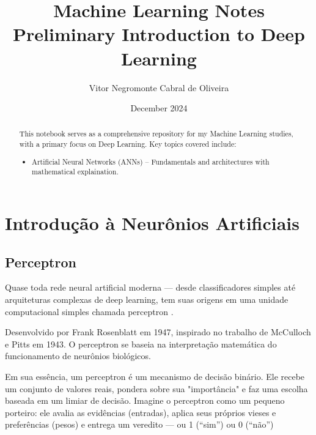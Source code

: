 \documentclass{tufte-handout}
\title{Machine Learning Notes \\ Preliminary Introduction to Deep Learning}
\author{Vitor Negromonte Cabral de Oliveira}
\date{December 2024}
\begin{document}
\maketitle
\begin{abstract}
    This notebook serves as a comprehensive repository for my Machine Learning studies, with a primary focus on Deep Learning. Key topics covered include:
    \begin{itemize}
        \item Artificial Neural Networks (ANNs) – Fundamentals and architectures with mathematical explaination.
    \end{itemize}
\end{abstract}

\newpage
\hypersetup{linkcolor=wp-text}
\tableofcontents
\hypersetup{linkcolor=wp-primary}
\newpage
\section{Introdução à Neurônios Artificiais}

\subsection{Perceptron}

Quase toda rede neural artificial moderna — desde classificadores simples até arquiteturas complexas de deep learning, tem suas origens em uma unidade computacional simples chamada perceptron .

Desenvolvido por Frank Rosenblatt em 1947, inspirado no trabalho de McCulloch e Pitts em 1943. O perceptron se baseia na interpretação matemática do funcionamento de neurônios biológicos.

Em sua essência, um perceptron é um mecanismo de decisão binário. Ele recebe um conjunto de valores reais, pondera sobre sua "importância"\sidenote{} e faz uma escolha baseada em um limiar de decisão. Imagine o perceptron como um pequeno porteiro: ele avalia as evidências (entradas), aplica seus próprios vieses e preferências (pesos) e entrega um veredito — ou 1 (“sim”) ou 0 (“não”)
\end{document}
